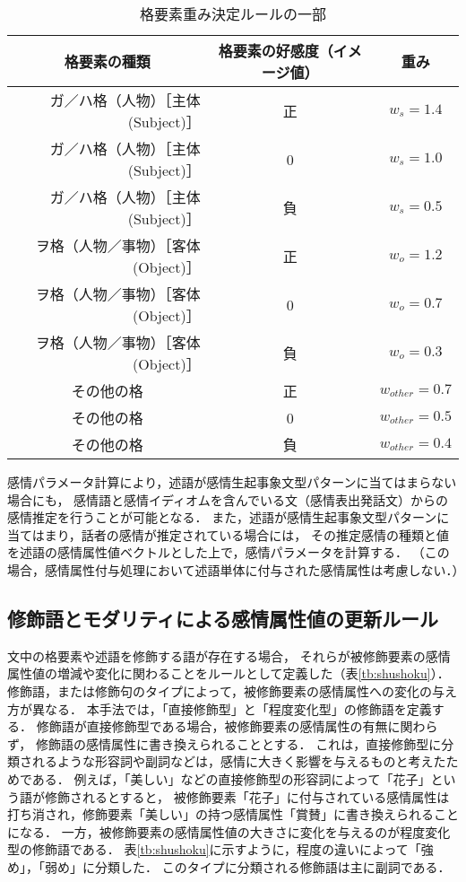 \documentclass[japanese]{jnlp_1.3c}
\begin{document}
\begin{table}[t]
\begin{center}
\caption{格要素重み決定ルールの一部}
\begin{tabular}{|r|c|c|}
\hline
\multicolumn{1}{|c|}{格要素の種類}	& 格要素の好感度（イメージ値）	& 	重み		\\ \hline \hline
ガ／ハ格（人物）［主体(Subject)］	& 正		&	$w_s = 1.4$		 \\ \hline
ガ／ハ格（人物）［主体(Subject)］   & 0		&	$w_s = 1.0$		\\ \hline
ガ／ハ格（人物）［主体(Subject)］    & 負	& $w_s = 0.5$		\\ \hline
ヲ格（人物／事物）［客体(Object)］ & 正	&	$w_o = 1.2$		 \\ \hline
ヲ格（人物／事物）［客体(Object)］ & 0      &	$w_o = 0.7$		\\ \hline
ヲ格（人物／事物）［客体(Object)］ & 負	&	$w_o = 0.3$		 \\ \hline
\multicolumn{1}{|c|}{その他の格}	&	正	&	$w_{other} = 0.7$	\\ \hline
\multicolumn{1}{|c|}{その他の格}	&	0	&	$w_{other} = 0.5$	\\ \hline
\multicolumn{1}{|c|}{その他の格}	&	負	&	$w_{other} = 0.4$	\\ \hline
\end{tabular}
\label{tb:svoBias}
\end{center}
\end{table}

感情パラメータ計算により，述語が感情生起事象文型パターンに当てはまらない場合にも，
感情語と感情イディオムを含んでいる文（感情表出発話文）からの感情推定を行うことが可能となる．
また，述語が感情生起事象文型パターンに当てはまり，話者の感情が推定されている場合には，
その推定感情の種類と値を述語の感情属性値ベクトルとした上で，感情パラメータを計算する．
（この場合，感情属性付与処理において述語単体に付与された感情属性は考慮しない．）

\subsection{修飾語とモダリティによる感情属性値の更新ルール}

文中の格要素や述語を修飾する語が存在する場合，
それらが被修飾要素の感情属性値の増減や変化に関わることをルールとして定義した（表\ref{tb:shushoku}）．
修飾語，または修飾句のタイプによって，被修飾要素の感情属性への変化の与え方が異なる．
本手法では，「直接修飾型」と「程度変化型」の修飾語を定義する．
修飾語が直接修飾型である場合，被修飾要素の感情属性の有無に関わらず，
修飾語の感情属性に書き換えられることとする．
これは，直接修飾型に分類されるような形容詞や副詞などは，感情に大きく影響を与えるものと考えたためである．
例えば，「美しい」などの直接修飾型の形容詞によって「花子」という語が修飾されるとすると，
被修飾要素「花子」に付与されている感情属性は打ち消され，修飾要素「美しい」の持つ感情属性「賞賛」に書き換えられることになる．
一方，被修飾要素の感情属性値の大きさに変化を与えるのが程度変化型の修飾語である．
表\ref{tb:shushoku}に示すように，程度の違いによって「強め」，「弱め」に分類した．
このタイプに分類される修飾語は主に副詞である．
\end{document}
